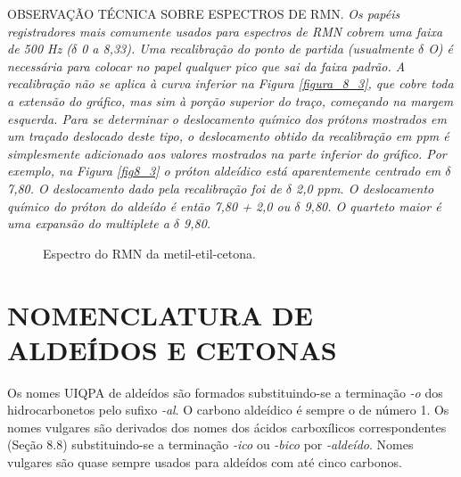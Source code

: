 \par\bigskip
\noindent OBSERVAÇÃO TÉCNICA SOBRE ESPECTROS DE RMN. \textit{Os papéis registradores mais comumente usados para espectros de RMN cobrem uma faixa de 500 Hz ($\delta$ 0 a 8,33). Uma recalibração do ponto de partida (usualmente $\delta$ O) é necessária para colocar no papel qualquer pico que sai da faixa padrão. A recalibração não se aplica à curva inferior na Figura \ref{figura_8_3}, que cobre toda a extensão do gráfico, mas sim à porção superior do traço, começando na margem esquerda. Para se determinar o deslocamento químico dos prótons mostrados em um traçado deslocado deste tipo, o deslocamento obtido da recalibração em ppm é simplesmente adicionado aos valores mostrados na parte inferior do gráfico. Por exemplo, na Figura \ref{fig8_3} o próton aldeídico está aparentemente centrado em $\delta$ 7,80. O deslocamento dado pela recalibração foi de $\delta$ 2,0 ppm. O deslocamento químico do próton do aldeído é então 7,80 + 2,0 ou $\delta$ 9,80. O quarteto maior é uma expansão do multiplete a $\delta$ 9,80.} 
\par\bigskip

\begin{figure}[H]
    \centering
    \caption{Espectro do RMN da metil-etil-cetona.}
    \label{fig8_4}
\end{figure}

\section{NOMENCLATURA DE ALDEÍDOS E CETONAS}

Os nomes UIQPA de aldeídos são formados substituindo-se a terminação \textit{-o} dos hidrocarbonetos pelo sufixo \textit{-al}. O carbono aldeídico é sempre o de número 1. Os nomes vulgares são derivados dos nomes dos ácidos carboxílicos correspondentes (Seção 8.8) substituindo-se a terminação \textit{-ico} ou \textit{-bico} por \textit{-aldeído}. Nomes vulgares são quase sempre usados para aldeídos com até cinco carbonos.

\begin{tightcenter}
    \chemnameinit{}
    \qquad
    \chemnameinit{}
    \qquad
    \chemnameinit{}
\end{tightcenter}


